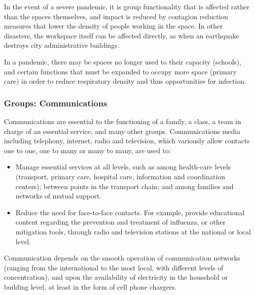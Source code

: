 \documentclass[12pt, a4]{scrartcl}
\begin{document}
In the event of a severe pandemic, it is group functionality that is affected rather than the spaces themselves, and impact is reduced by contagion reduction measures that lower the density of people working in the space. In other disasters, the workspace itself can be affected directly, as when an earthquake destroys city administrative buildings.

In a pandemic, there may be spaces no longer used to their capacity (schools), and certain functions that must be expanded to occupy more space (primary care) in order to reduce respiratory density and thus opportunities for infection.

\subsubsection{Groups: Communications}
Communications are essential to the functioning of a family, a class, a team in charge of an essential service, and many other groups. Communications media including telephony, internet, radio and television, which variously allow contacts one to one, one to many or many to many, are used to:

\begin{itemize}
	\item Manage essential services at all levels, such as among health-care levels (transport, primary care, hospital care, information and coordination centers); between points in the transport chain; and among families and networks of mutual support.
	\item Reduce the need for face-to-face contacts. For example, provide educational content regarding the prevention and treatment of influenza, or other mitigation tools, through radio and television stations at the national or local level.
\end{itemize}

Communication depends on the smooth operation of communication networks (ranging from the international to the most local, with different levels of concentration), and upon the availability of electricity in the household or building level, at least in the form of cell phone chargers. 
\end{document}
